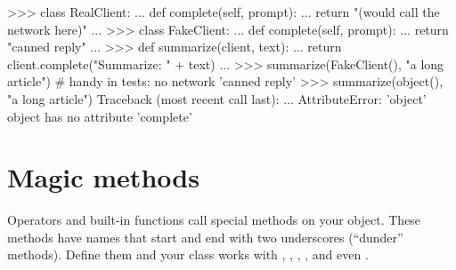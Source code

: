 \begin{center}
\end{center}

\begin{pycode}
>>> class RealClient:
...     def complete(self, prompt):
...         return "(would call the network here)"
...
>>> class FakeClient:
...     def complete(self, prompt):
...         return "canned reply"
...
>>> def summarize(client, text):
...     return client.complete("Summarize: " + text)
...
>>> summarize(FakeClient(), "a long article")   # handy in tests: no network
'canned reply'
>>> summarize(object(), "a long article")
Traceback (most recent call last):
  ...
AttributeError: 'object' object has no attribute 'complete'
\end{pycode}

\section{Magic methods}

Operators and built-in functions call special methods on your object. These methods have names
that start and end with two underscores (``dunder'' methods). Define them and your class works
with \code{==}, \code{+}, , , \code{[]} and even \code{()}.


